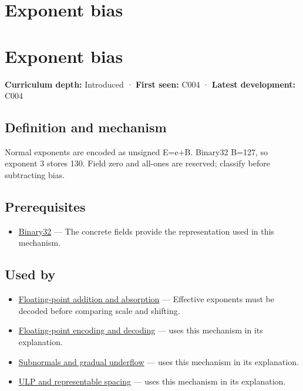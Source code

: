 \hypertarget{appendix-2fae058c82e1}{}
\section*{Exponent bias}
\section{Exponent bias}\label{appendix-2fae058c82e1-exponent-bias}

\textbf{Curriculum depth:} Introduced · \textbf{First seen:} C004 · \textbf{Latest development:} C004

\subsection{Definition and mechanism}\label{appendix-2fae058c82e1-definition-and-mechanism}

Normal exponents are encoded as unsigned E=e+B. Binary32 B=127, so exponent 3 stores 130. Field zero and all-ones are reserved; classify before subtracting bias.

\subsection{Prerequisites}\label{appendix-2fae058c82e1-prerequisites}

\begin{itemize}
\tightlist
\item
  \hyperref[appendix-5057f9ad327f]{Binary32} --- The concrete fields provide the representation used in this mechanism.
\end{itemize}

\subsection{Used by}\label{appendix-2fae058c82e1-used-by}

\begin{itemize}
\item
  \hyperref[appendix-a1b1b4580dfd]{Floating-point addition and absorption} --- Effective exponents must be decoded before comparing scale and shifting.
\item
  \hyperref[appendix-6854d0e2218e]{Floating-point encoding and decoding} --- uses this mechanism in its explanation.
\item
  \hyperref[appendix-00a6e044c437]{Subnormals and gradual underflow} --- uses this mechanism in its explanation.
\item
  \hyperref[appendix-14bab4cab9d4]{ULP and representable spacing} --- uses this mechanism in its explanation.
\end{itemize}


